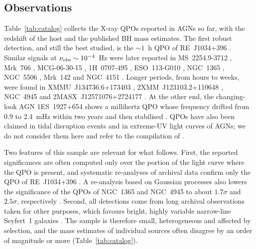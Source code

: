 \subsection{Observations}
Table~\ref{tab:catalog} collects the X-ray QPOs reported in AGNs so far, with the redshift of the host and the published BH mass estimates.
The first robust detection, and still the best studied, is the $\sim1$~h QPO of RE~J1034+396 \citep{Gierlinski2008, Alston2014}.
Similar signals at $\nu_\textup{obs}\sim10^{-4}$~Hz were later reported in MS~2254.9-3712 \citep{Alston2015}, Mrk~766 \citep{Zhang2017}, MCG-06-30-15 \citep{Gupta2018}, 1H~0707-495 \citep{Pan2016,Zhang2018a}, ESO~113-G010 \citep{Zhang2020}, NGC~1365 \citep{Yan2024}, NGC~5506 \citep{Zhang2025}, Mrk~142 \citep{Zhong2024} and NGC~4151 \citep{Yan2025}.
Longer periods, from hours to weeks, were found in XMMU~J134736.6+173403 \citep[J1347 hereafter;][]{Carpano2018}, 2XMM~J123103.2+110648 \citep[J1231;][]{Lin2013}, NGC~4945 \citep{Smith2020} and 2MASX~J12571076+2724177 \citep[J1257;][]{j1257}.
At the other end, the changing-look AGN 1ES~1927+654 shows a millihertz QPO whose frequency drifted from 0.9 to 2.4~mHz within two years and then stabilised \citep{Masterson2025,Masterson2026}.
QPOs have also been claimed in tidal disruption events and in extreme-UV light curves of AGNs; we do not consider them here and refer to the compilation of \citet{Smith2021}.

Two features of this sample are relevant for what follows.
First, the reported significances are often computed only over the portion of the light curve where the QPO is present, and systematic re-analyses of archival data confirm only the QPO of RE~J1034+396 \citep{GonzalezMartin2012,Zhang2023}.
A re-analysis based on Gaussian processes also lowers the significance of the QPOs of NGC~1365 and NGC~4945 to about $1.7\sigma$ and $2.5\sigma$, respectively \citep{Gurpide2025}.
Second, all detections come from long archival observations taken for other purposes, which favours bright, highly variable narrow-line Seyfert~1 galaxies \citep{Smith2021}.
The sample is therefore small, heterogeneous and affected by selection, and the mass estimates of individual sources often disagree by an order of magnitude or more (Table~\ref{tab:catalog}).

